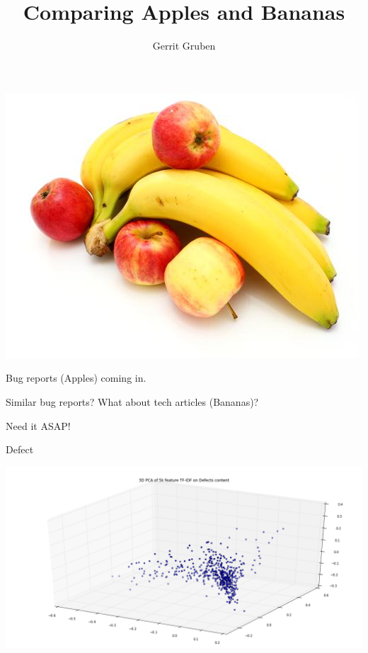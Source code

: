 \documentclass[pdf, 16pt]{beamer}
\title{Comparing Apples and Bananas}
\author{Gerrit Gruben}
\begin{document}
\frame{\maketitle}

\begin{frame}
  \begin{center}
    \includegraphics[scale=0.4]{banana}
  \end{center}

  \pause Bug reports (Apples) coming in.
  \pause \par Similar bug reports? What about tech articles (Bananas)?
  \pause \par Need it ASAP!

\end{frame}

\begin{frame}{Defect}
  \begin{center}
    \includegraphics[scale=0.3]{tfidf_pca3d}
  \end{center}
\end{frame}
\end{document}
